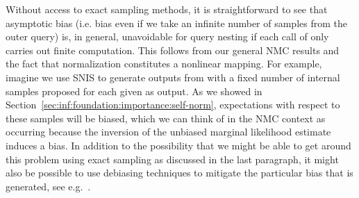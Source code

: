

Without access to exact sampling methods, it is straightforward to see 
that asymptotic bias (i.e. bias even if we take
an infinite number of samples from the outer query) is, in general, unavoidable for
query nesting if each call of \conditional only carries out finite computation.  
This follows from our general NMC results and
the fact that normalization constitutes a nonlinear mapping.
For example, imagine we
use SNIS to generate outputs from \conditional
with a fixed number of internal samples proposed for each given as output.  As we showed in 
Section~\ref{sec:inf:foundation:importance:self-norm}, expectations with respect to these samples will be
biased, which we can think of in the NMC context as occurring because the inversion of the unbiased marginal likelihood estimate
induces a bias.  In addition to the possibility that we might be able to get around this
problem using exact sampling as discussed in the last paragraph, it might also be possible to
use debiasing techniques to mitigate the particular bias that is generated, see e.g.~\cite{glynn2014exact,jacob2017smoothing}.

